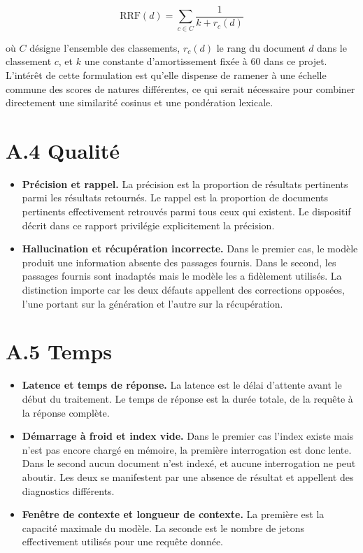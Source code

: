 \begin{equation}
\mathrm{RRF}(d) = \sum_{c \in C} \frac{1}{k + r_c(d)}
\end{equation}

où $C$ désigne l'ensemble des classements, $r_c(d)$ le rang du document $d$ dans le classement $c$, et $k$ une constante d'amortissement fixée à 60 dans ce projet. L'intérêt de cette formulation est qu'elle dispense de ramener à une échelle commune des scores de natures différentes, ce qui serait nécessaire pour combiner directement une similarité cosinus et une pondération lexicale.

\section*{A.4 Qualité}

\begin{itemize}
  \item \textbf{Précision et rappel.} La précision est la proportion de résultats pertinents parmi les résultats retournés. Le rappel est la proportion de documents pertinents effectivement retrouvés parmi tous ceux qui existent. Le dispositif décrit dans ce rapport privilégie explicitement la précision.
  \item \textbf{Hallucination et récupération incorrecte.} Dans le premier cas, le modèle produit une information absente des passages fournis. Dans le second, les passages fournis sont inadaptés mais le modèle les a fidèlement utilisés. La distinction importe car les deux défauts appellent des corrections opposées, l'une portant sur la génération et l'autre sur la récupération.
\end{itemize}

\section*{A.5 Temps}

\begin{itemize}
  \item \textbf{Latence et temps de réponse.} La latence est le délai d'attente avant le début du traitement. Le temps de réponse est la durée totale, de la requête à la réponse complète.
  \item \textbf{Démarrage à froid et index vide.} Dans le premier cas l'index existe mais n'est pas encore chargé en mémoire, la première interrogation est donc lente. Dans le second aucun document n'est indexé, et aucune interrogation ne peut aboutir. Les deux se manifestent par une absence de résultat et appellent des diagnostics différents.
  \item \textbf{Fenêtre de contexte et longueur de contexte.} La première est la capacité maximale du modèle. La seconde est le nombre de jetons effectivement utilisés pour une requête donnée.
\end{itemize}

